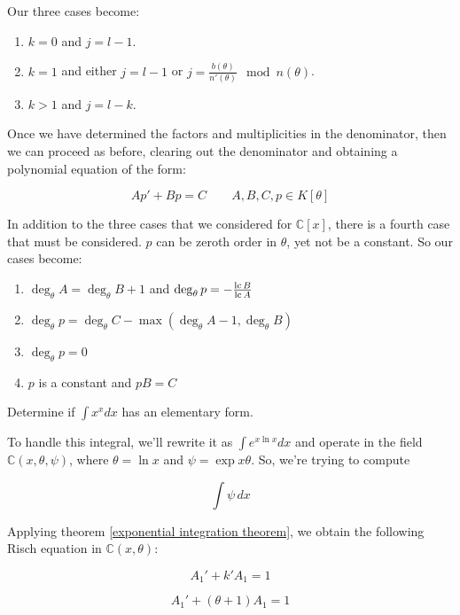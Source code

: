 Our three cases become:

\begin{enumerate}

\item $k=0$ and $j = l-1$.

\item $k=1$ and either $j=l-1$ or $j = \frac{b(\theta)}{n'(\theta)} \mod n(\theta)$.

\item $k>1$ and $j=l-k$.

\end{enumerate}

Once we have determined the factors and multiplicities in the denominator,
then we can proceed as before, clearing out the denominator and obtaining
a polynomial equation of the form:

\begin{equation}
\label{eq: K[theta] normal Risch}
A p' + B p = C \qquad A,B,C,p \in K[\theta]
\end{equation}

In addition to the three cases that we considered for ${\mathbb C}[x]$,
there is a fourth case that must be considered.  $p$ can be
zeroth order in $\theta$, yet not be a constant.  So our
cases become:

\begin{enumerate}
\item $\deg_\theta A = \deg_\theta B + 1$ and $\deg_\theta p =-\frac{{\rm lc\,} B}{{\rm lc\,} A} $
\item $\deg_\theta p = \deg_\theta C - \max(\deg_\theta A - 1, \deg_\theta B)$
\item $\deg_\theta p = 0$
\item $p$ is a constant and $pB = C$
\end{enumerate}

\vfill\eject

\example Determine if $\int x^x dx$ has an elementary form.

To handle this integral, we'll rewrite it as $\int e^{x \ln x} dx$
and operate in the field ${\mathbb C}(x, \theta, \psi)$, where
$\theta = \ln x$ and $\psi = \exp x\theta$.  So, we're
trying to compute

$$\int \psi\, dx$$

Applying theorem \ref{exponential integration theorem}, we
obtain the following Risch equation in
${\mathbb C}(x, \theta)$:

$$A_1' + k' A_1 = 1$$

\begin{equation}
\label{x^x Risch equation}
A_1' + (\theta + 1) A_1 = 1
\end{equation}

